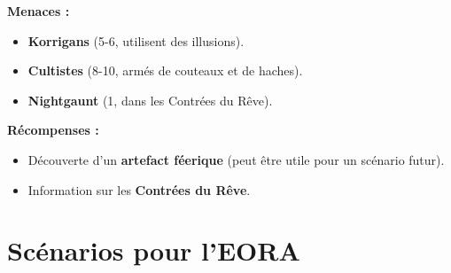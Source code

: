 \documentclass[10pt,a5paper,twoside]{book}
\begin{document}
\begin{shaded}
\textbf{Menaces :}
	\begin{itemize}
		\item \textbf{Korrigans} (5-6, utilisent des illusions).
		\item \textbf{Cultistes} (8-10, armés de couteaux et de haches).
		\item \textbf{Nightgaunt} (1, dans les Contrées du Rêve).
	\end{itemize}

\textbf{Récompenses :}
	\begin{itemize}
		\item Découverte d'un \textbf{artefact féerique} (peut être utile pour un scénario futur).
		\item Information sur les \textbf{Contrées du Rêve}.
	\end{itemize}
\end{shaded}

\newpage

\section{Scénarios pour l'EORA}
\end{document}
